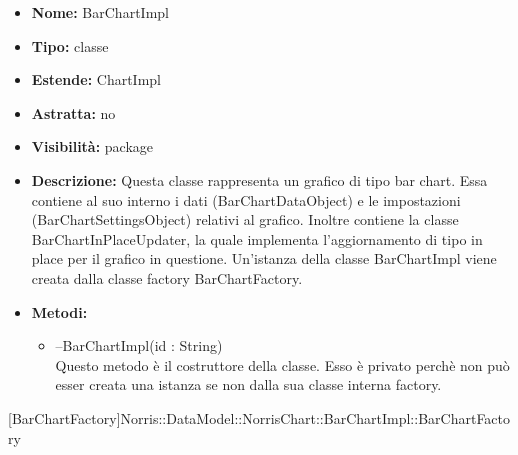 			
			\begin{itemize}
			\item \textbf{Nome:} BarChartImpl
			\item \textbf{Tipo:} classe
			
		\item \textbf{Estende:}
		ChartImpl
		\item \textbf{Astratta:}
		no
			\item \textbf{Visibilità:} package
			\item \textbf{Descrizione:} Questa classe rappresenta un grafico di tipo bar chart. Essa contiene al suo interno i dati (BarChartDataObject) e le impostazioni (BarChartSettingsObject) relativi al grafico. Inoltre contiene la classe BarChartInPlaceUpdater, la quale implementa l'aggiornamento di tipo in place per il grafico in questione. Un'istanza della classe BarChartImpl viene creata dalla classe factory BarChartFactory.

			\item \textbf{Metodi:}
				\begin{itemize}
				\setlength{\itemsep}{5pt}
				
					\item[\ding{111}] {{--BarChartImpl(id : String)}} \\ [1mm] Questo metodo è il costruttore della classe. Esso è privato perchè non può esser creata una istanza se non dalla sua classe interna factory.
				\end{itemize}
		
			\end{itemize}

			
			[BarChartFactory]{Norris::DataModel::NorrisChart::BarChartImpl::BarChartFactory}
			

	
